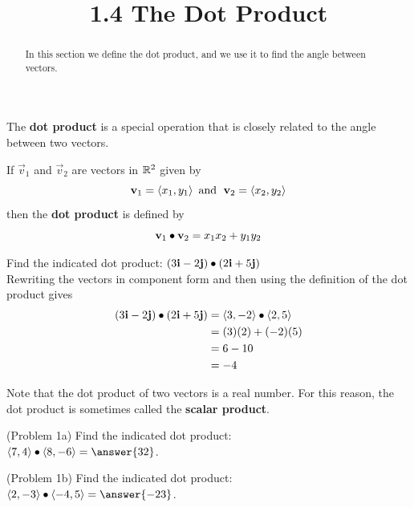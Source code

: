 \documentclass[handout]{ximera}
\title{1.4 The Dot Product}
\begin{document}
\begin{abstract}
In this section we define the dot product, and we use it to find the angle between vectors.
\end{abstract}
 
\maketitle  

The \textbf{dot product} is a special operation that is closely related to the angle between two vectors.
\begin{definition}
If $\vec{v}_1$ and $\vec{v}_2$ are vectors in $\mathbb R^2$ given by
\[
\mathbf{v}_1 = \left\langle x_1, y_1\right\rangle \text{  and   } \;\mathbf{v}_2 = \left\langle x_2, y_2\right\rangle
\]
then the \textbf{dot product} is defined by
\[
\mathbf{v}_1 \bullet \mathbf{v}_2 = x_1x_2 + y_1y_2
\]
\end{definition}

\begin{example}[Example 1]
Find the indicated dot product: $\left(3\mathbf{i} -2\mathbf{j}\right) \bullet \left(2\mathbf{i} +5\mathbf{j}\right)$\\
Rewriting the vectors in component form and then using the definition of the dot product gives
\begin{align*}
\left(3\mathbf{i} -2\mathbf{j}\right) \bullet \left(2\mathbf{i} +5\mathbf{j}\right) &= \left\langle 3, -2\right\rangle \bullet \left\langle 2, 5\right\rangle\\
                                                                      &= (3)(2)+(-2)(5)\\
                                                                      & = 6-10\\
                                                                      &= -4
\end{align*}
\end{example}

Note that the dot product of two vectors is a real number.  For this reason, the dot product is sometimes called the \textbf{scalar product}.

\begin{problem}(Problem 1a)
Find the indicated dot product: \\
$\vector{7, 4} \dotp \vector{8, -6} = \answer{32}$.
\end{problem}

\begin{problem}(Problem 1b)
Find the indicated dot product: \\
$\vector{2, -3} \dotp \vector{-4, 5} = \answer{-23}$.
\end{problem}
\end{document}

